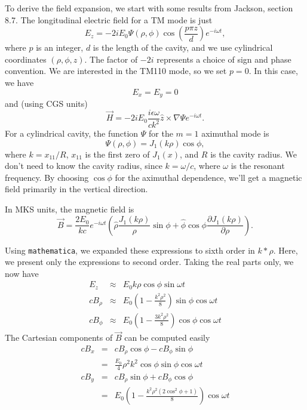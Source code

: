 To derive the field expansion, we start with some results from
Jackson\cite{Jackson}, section 8.7.  The longitudinal electric field
for a TM mode is just
\begin{equation}
E_z = - 2 i E_0 \Psi(\rho, \phi) \cos \left(\frac{p \pi z}{d}\right) e^{-i\omega t},
\end{equation}
where $p$ is an integer, $d$ is the length of the cavity, and we use
cylindrical coordinates $(\rho, \phi, z)$.  The factor of $-2i$ represents a
choice of sign and phase convention.  We are interested in the
TM110 mode, so we set $p=0$.  In this case, we have
\begin{equation}
E_x = E_y = 0 
\end{equation}
and (using CGS units)
\begin{equation}
\vec{H} = - 2 i E_0 \frac{i \epsilon \omega}{c k^2} \hat{z} \times \nabla \Psi e^{-i \omega t}.
\end{equation}
For a cylindrical cavity, the function $\Psi$ for the $m=1$ aximuthal mode is 
\begin{equation}
\Psi(\rho, \phi) = J_1 (k \rho) \cos \phi,
\end{equation}
where $k = x_{11}/R$, $x_{11}$ is the first zero of $J_1(x)$, and $R$ is the cavity radius.
We don't need to know the cavity radius, since $k = \omega/c$, where $\omega$ is the
resonant frequency.  By choosing $\cos\phi$ for the aximuthal dependence, we'll get 
a magnetic field primarily in the vertical direction.

In MKS units, the magnetic field is
\begin{equation}
\vec{B} = \frac{2 E_0}{k c} e^{-i \omega t} \left( \hat{\rho} \frac{J_1(k\rho)}{\rho} \sin \phi
        + \hat{\phi} \cos\phi \frac{\partial J_1(k\rho)}{\partial \rho}\right).
\end{equation}

Using {\tt mathematica}, we expanded these expressions to sixth order
in $k*\rho$.  Here, we present only the expressions to second
order. Taking the real parts only, we now have
\begin{eqnarray}
E_z & \approx & E_0 k \rho \cos \phi \sin \omega t \\
c B_\rho  & \approx & E_0 \left(1 - \frac{k^2 \rho^2}{8}\right)\sin\phi \cos\omega t \\
c B_\phi  & \approx & E_0 \left(1 - \frac{3 k^2 \rho^2}{8}\right)\cos\phi \cos\omega t 
\end{eqnarray}
The Cartesian components of $\vec{B}$ can be computed easily
\begin{eqnarray}
c B_x & = & c B_\rho\cos\phi - c B_\phi\sin\phi \\
      & = & \frac{E_0}{4} \rho^2 k^2 \cos\phi \sin\phi \cos\omega t \\
c B_y & = & c B_\rho\sin\phi + c B_\phi\cos\phi \\
      & = & E_0 \left(1 - \frac{k^2\rho^2 (2 \cos^2\phi + 1)}{8}\right) \cos\omega t 
\end{eqnarray}

